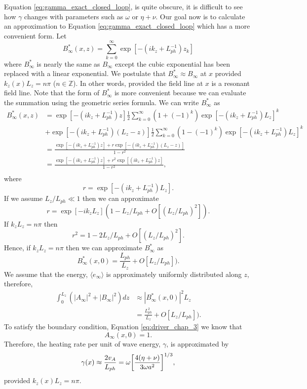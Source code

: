 Equation \eqref{eq:gamma_exact_closed_loop}, is quite obscure, it is difficult to see how $\gamma$ changes with parameters such as $\omega$ or $\eta+\nu$. Our goal now is to calculate an approximation to Equation \eqref{eq:gamma_exact_closed_loop} which has a more convenient form. Let
\begin{equation}
    B_\infty^*(x,z) = \sum_{k=0}^\infty \exp[-(ik_z+L_{ph}^{-1})z_k]
\end{equation}
where $B_\infty^*$ is nearly the same as $B_\infty$ except the cubic exponential has been replaced with a linear exponential. We postulate that $B_\infty^*\approx B_\infty$ at $x$ provided $k_z(x)L_z=n\pi$ ($n\in\mathds{Z}$). In other words, provided the field line at $x$ is a resonant field line. Note that the form of $B_\infty^*$ is more convenient because we can evaluate the summation using the geometric series formula. We can write $B_\infty^*$ as
\[\begin{aligned}
B_\infty^*(x,z) &= \exp[-(ik_z + L_{ph}^{-1})z]\frac{1}{2}\sum_{k=0}^\infty(1 + (-1)^k) \exp[-(ik_z + L_{ph}^{-1})L_z]^k \\
&+\exp[-(ik_z + L_{ph}^{-1})(L_z-z)]\frac{1}{2}\sum_{k=0}^\infty(1 - (-1)^k) \exp[-(ik_z + L_{ph}^{-1})L_z]^k \\
&=\frac{\exp[-(ik_z + L_{ph}^{-1})z] + r\exp[-(ik_z + L_{ph}^{-1})(L_z - z)]}{1-r^2} \\
&=\frac{\exp[-(ik_z + L_{ph}^{-1})z] + r^2\exp[(ik_z + L_{ph}^{-1})z]}{1-r^2}, \\
\end{aligned}\]
where
\begin{equation}
    r = \exp[-(ik_z+L_{ph}^{-1})L_z].
\end{equation}
If we assume $L_z/L_{ph} \ll 1$ then we can approximate 
\[r = \exp[-ik_zL_z] (1 - L_z / L_{ph} + O[(L_z/L_{ph})^2]).\]
If $k_zL_z = n\pi$ then
\[r^2 = 1 - 2L_z / L_{ph} +  O[(L_z/L_{ph})^2].\]
Hence, if $k_zL_z=n\pi$ then we can approximate $B_\infty^*$ as
\[B_\infty^*(x,0)=\frac{L_{ph}}{L_z} + O[L_z/L_{ph}]).\]
We assume that the energy, $\langle e_\infty \rangle$ is approximately uniformly distributed along $z$, therefore,
\[\begin{aligned}
\int_{0}^{L_z}(|A_\infty|^2 + |B_\infty|^2) dz &\approx |B_\infty^*(x,0)|^2 L_z \\
&= \frac{L_{ph}^2}{L_z} +  O[L_z/L_{ph}]).
\end{aligned}\]
To satisfy the boundary condition, Equation \eqref{eq:driver_chap_3} we know that
\[A_\infty(x,0) = 1.\]
Therefore, the heating rate per unit of wave energy, $\gamma$, is approximated by
\begin{equation}
    \label{eq:gamma_approx_closed_loop}
    \gamma(x) \approx \frac{2 v_A}{L_{ph}}=\omega\qty[\frac{4(\eta+\nu)}{3\omega a^2}]^{1/3},
\end{equation}
provided $k_z(x)L_z = n\pi$.

